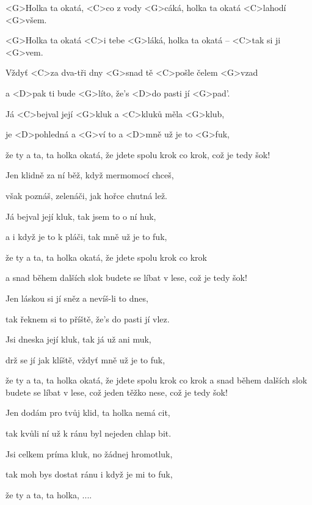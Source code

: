 

\zr
<G>Holka ta okatá, <C>co z vody <G>cáká,
holka ta okatá <C>lahodí <G>všem.

<G>Holka ta okatá <C>i tebe <G>láká,
holka ta okatá -- <C>tak si ji <G>vem.
\kr

\zs
Vždyť <C>za dva-tři dny <G>snad tě <C>pošle čelem <G>vzad

a <D>pak ti bude <G>líto, že's <D>do pasti jí <G>pad'.

Já <C>bejval její <G>kluk a <C>kluků měla <G>klub,

je <D>pohledná a <G>ví to a <D>mně už je to <G>fuk,

že ty a ta, ta holka okatá, že jdete spolu krok co krok,
což je tedy šok!
\ks

\zr \kr

\zs
Jen klidně za ní běž, když mermomocí chceš,

však poznáš, zelenáči, jak hořce chutná lež.

Já bejval její kluk, tak jsem to o ní huk,

a i když je to k pláči, tak mně už je to fuk,

že ty a ta, ta holka okatá, že jdete spolu krok co krok

a snad během dalších slok budete se líbat v lese,
což je tedy šok!
\ks

\zr \kr

\zs
Jen láskou si jí sněz a nevíš-li to dnes,

tak řeknem si to příště, že's do pasti jí vlez.

Jsi dneska její kluk, tak já už ani muk,

drž se jí jak klíště, vždyť mně už je to fuk,

že ty a ta, ta holka okatá, že jdete spolu krok co krok
a snad během dalších slok
budete se líbat v lese, což jeden těžko nese, což je tedy šok!
\ks

\zr \kr

\zs
Jen dodám pro tvůj klid, ta holka nemá cit,

tak kvůli ní už k ránu byl nejeden chlap bit.

Jsi celkem príma kluk, no žádnej hromotluk,

tak moh bys dostat ránu i když je mi to fuk,

že ty a ta, ta holka, ....
\ks

\kp
